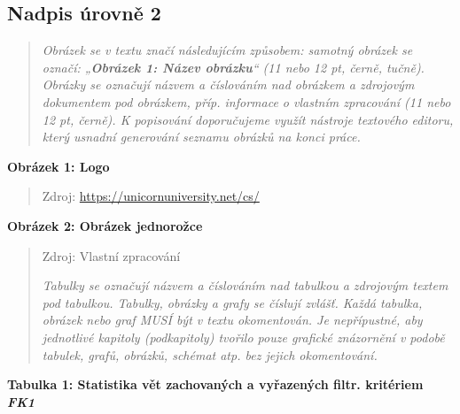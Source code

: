 \documentclass[
]{article}
\begin{document}
\hypertarget{nadpis-uxfarovnux11b-2-2}{%
  \subsection{Nadpis úrovně 2}\label{nadpis-uxfarovnux11b-2-2}}

\begin{quote}
  \emph{Obrázek se v textu značí následujícím způsobem: samotný obrázek se
    označí: „\textbf{Obrázek 1: Název obrázku}`` (11 nebo 12 pt, černě,
    tučně). Obrázky se označují názvem a číslováním nad obrázkem a zdrojovým
    dokumentem pod obrázkem, příp. informace o vlastním zpracování (11 nebo
    12 pt, černě). K popisování doporučujeme využít nástroje textového
    editoru, který usnadní generování seznamu obrázků na konci práce.}
\end{quote}

\textbf{Obrázek 1: Logo}


\begin{quote}
  Zdroj: \url{https://unicornuniversity.net/cs/}
\end{quote}

\newpage
\textbf{Obrázek 2: Obrázek jednorožce}

\begin{quote}

  Zdroj: Vlastní zpracování

  \emph{Tabulky se označují názvem a číslováním nad tabulkou a zdrojovým
    textem pod tabulkou. Tabulky, obrázky a grafy se číslují zvlášť. Každá
    tabulka, obrázek nebo graf MUSÍ být v textu okomentován. Je nepřípustné,
    aby jednotlivé kapitoly (podkapitoly) tvořilo pouze grafické znázornění
    v podobě tabulek, grafů, obrázků, schémat atp. bez jejich okomentování.}
\end{quote}

\protect\hypertarget{_bookmark9}{}{}\textbf{Tabulka 1: Statistika vět
  zachovaných a vyřazených filtr. kritériem \emph{FK1}}
\end{document}
